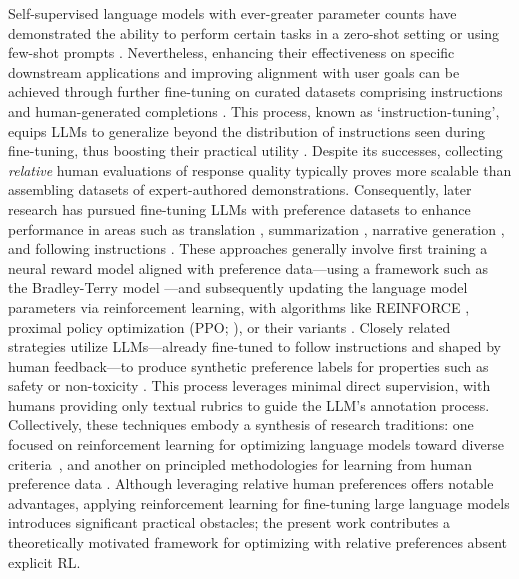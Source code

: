 Self-supervised language models with ever-greater parameter counts have demonstrated the ability to perform certain tasks in a zero-shot setting \citep{radford2019language} or using few-shot prompts \citep{gpt3,megatron,chowdhery2022palm}. Nevertheless, enhancing their effectiveness on specific downstream applications and improving alignment with user goals can be achieved through further fine-tuning on curated datasets comprising instructions and human-generated completions \citep{mishra-etal-2022-cross,sanh2022multitask,chung2022scaling,thoppilan2022lamda}. This process, known as `instruction-tuning', equips LLMs to generalize beyond the distribution of instructions seen during fine-tuning, thus boosting their practical utility \citep{chung2022scaling}. Despite its successes, collecting \textit{relative} human evaluations of response quality typically proves more scalable than assembling datasets of expert-authored demonstrations. Consequently, later research has pursued fine-tuning LLMs with preference datasets to enhance performance in areas such as translation \citep{kreutzer-etal-2018-reliability}, summarization \citep{stiennon2022learning,ziegler2020finetuning}, narrative generation \citep{ziegler2020finetuning}, and following instructions \citep{ouyang2022training,ramamurthy2023is}. These approaches generally involve first training a neural reward model aligned with preference data—using a framework such as the Bradley-Terry model \citep{bradley1952rankanalysis}—and subsequently updating the language model parameters via reinforcement learning, with algorithms like REINFORCE \citep{williams1992reinforce}, proximal policy optimization (PPO; \cite{schulman2017proximal}), or their variants \citep{ramamurthy2023is}. Closely related strategies utilize LLMs—already fine-tuned to follow instructions and shaped by human feedback—to produce synthetic preference labels for properties such as safety or non-toxicity \citep{bai2022constitutional}. This process leverages minimal direct supervision, with humans providing only textual rubrics to guide the LLM's annotation process. Collectively, these techniques embody a synthesis of research traditions: one focused on reinforcement learning for optimizing language models toward diverse criteria~\citep{Ranzato2015SequenceLT,paulus2018a,wu2018learning}, and another on principled methodologies for learning from human preference data \citep{christiano2017deep,kupcsik2018learning}. Although leveraging relative human preferences offers notable advantages, applying reinforcement learning for fine-tuning large language models introduces significant practical obstacles; the present work contributes a theoretically motivated framework for optimizing with relative preferences absent explicit RL.


